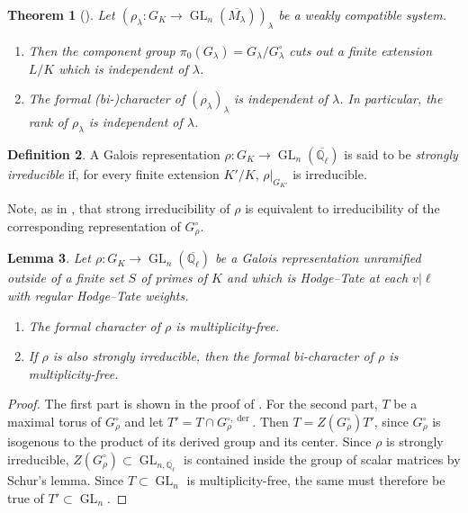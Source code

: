\documentclass{amsart}
\newtheorem{theorem}{Theorem}[section]
\newtheorem{lemma}[theorem]{Lemma}
\theoremstyle{definition}
\newtheorem{definition}[theorem]{Definition}
\numberwithin{equation}{section} %
\newcommand{\GL}{\operatorname{GL}}
\newcommand{\der}{\operatorname{der}}
\newcommand{\Qlbar}{\ensuremath{\overline{\mathbb{Q}_\ell}}}
\newcommand{\ol}[1]{\overline{#1}}
\begin{document}
\begin{theorem}[{\cite[Theorem 2.4, Remark 2.5]{Hui23}}] \label{thm: formal char independent of l}
Let $(\rho_\lambda: G_K \to \GL_n(\ol{M_\lambda}))_\lambda$ be a weakly compatible system.
\begin{enumerate}
    \item Then the component group $\pi_0(G_{\lambda}) = G_{\lambda}/G_{\lambda}^\circ$ cuts out a finite extension $L/K$ which is independent of $\lambda$.
    \item The formal (bi-)character of $(\rho_\lambda)_\lambda$ is independent of $\lambda$.
    In particular, the rank of $\rho_\lambda$ is independent of $\lambda$.
\end{enumerate}
\end{theorem}

\begin{definition} \label{defn: strongly irreducible}
A Galois representation $\rho: G_K \to \GL_n(\Qlbar)$ is said to be \emph{strongly irreducible} if, for every finite extension $K'/K$, $\rho|_{G_{K'}}$ is irreducible.    
\end{definition}

Note, as in \cite[Remark 3.2.7]{CEG22}, that strong irreducibility of $\rho$ is equivalent to irreducibility of the corresponding representation of $G_{\rho}^\circ$.

\begin{lemma} \label{lemma: formal char is multiplicity-free}
Let $\rho: G_K \to \GL_n(\Qlbar)$ be a Galois representation unramified outside of a finite set $S$ of primes of $K$ and which is Hodge--Tate at each $v|\ell$ with regular Hodge--Tate weights.
\begin{enumerate}
    \item The formal character of $\rho$ is multiplicity-free.
    \item If $\rho$ is also strongly irreducible, then the formal bi-character of $\rho$ is multiplicity-free.
\end{enumerate}
\end{lemma}
\begin{proof}
The first part is shown in the proof of \cite[Lemma 5.3.1]{BLGGT14}.
For the second part, $T$ be a maximal torus of $G_{\rho}^\circ$ and let $T' = T \cap G_{\rho}^{\circ,\der}$.
Then $T = Z(G_\rho^\circ) T'$, since $G_\rho^\circ$ is isogenous to the product of its derived group and its center.
Since $\rho$ is strongly irreducible, $Z(G_\rho^\circ) \subset \GL_{n,\Qlbar}$ is contained inside the group of scalar matrices by Schur's lemma.
Since $T \subset \GL_n$ is multiplicity-free, the same must therefore be true of $T' \subset \GL_n$.
\end{proof}
\end{document}
